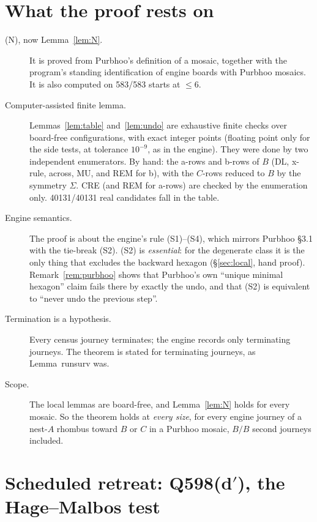 \documentclass[11pt]{article}
\theoremstyle{definition}\newtheorem{definition}[theorem]{Definition}\newtheorem{remark}[theorem]{Remark}
\begin{document}
\section{What the proof rests on}\label{sec:gaps}
\begin{description}
\item[(N), now Lemma~\ref{lem:N}.] It is proved from Purbhoo's definition of a mosaic, together with the program's standing identification of engine boards with Purbhoo mosaics. It is also computed on 583/583 starts at $\le6$.
\item[Computer-assisted finite lemma.] Lemmas~\ref{lem:table} and~\ref{lem:undo} are exhaustive finite checks over board-free configurations, with exact integer points (floating point only for the side tests, at tolerance $10^{-9}$, as in the engine).
They were done by two independent enumerators. By hand: the a-rows and b-rows of $B$ (DL, x-rule, across, MU, and REM for b), with the $C$-rows reduced to $B$ by the symmetry $\Sigma$. CRE (and REM for a-rows) are checked by the enumeration only. 40131/40131 real candidates fall in the table.
\item[Engine semantics.] The proof is about the engine's rule (S1)--(S4), which mirrors Purbhoo \S3.1 with the tie-break (S2). (S2) is \emph{essential}: for the degenerate class it is the only thing that excludes the backward hexagon (\S\ref{sec:local}, hand proof). Remark~\ref{rem:purbhoo} shows that Purbhoo's own ``unique minimal hexagon'' claim fails there by exactly the undo, and that (S2) is equivalent to ``never undo the previous step''.
\item[Termination is a hypothesis.] Every census journey terminates; the engine records only terminating journeys. The theorem is stated for terminating journeys, as Lemma~runsurv was.
\item[Scope.] The local lemmas are board-free, and Lemma~\ref{lem:N} holds for every mosaic. So the theorem holds at \emph{every size}, for every engine journey of a nest-$A$ rhombus toward $B$ or $C$ in a Purbhoo mosaic, $B/B$ second journeys included.
\end{description}

\section{Scheduled retreat: Q598(d$'$), the Hage--Malbos test}\label{sec:q598}
\end{document}
